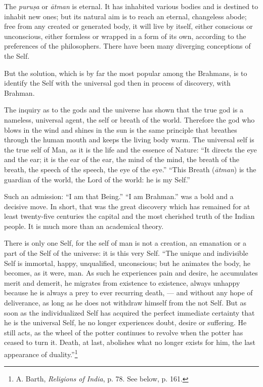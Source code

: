 \documentclass[a4paper, 11pt, oneside, english, landscape]{article}
\begin{document}
The \emph{puruṣa} or \emph{ātman} is eternal. It has inhabited various bodies and is destined to inhabit new ones; but its natural aim is to reach an eternal, changeless abode; free from any created or generated body, it will live by itself, either conscious or unconscious, either formless or wrapped in a form of its own, according to the preferences of the philosophers. There have been many diverging conceptions of the Self.

But the solution, which is by far the most popular among the Brahmans, is to identify the Self with the universal god then in process of discovery, with Brahman.

The inquiry as to the gods and the universe has shown that the true god is a nameless, universal agent, the self or breath of the world. Therefore the god who blows in the wind and shines in the sun is the same principle that breathes through the human mouth and keeps the living body warm. The universal self is the true self of Man, as it is the life and the essence of Nature: ``It directs the eye and the ear; it is the ear of the ear, the mind of the mind, the breath of the breath, the speech of the speech, the eye of the eye.'' ``This Breath (\emph{ātman}) is the guardian of the world, the Lord of the world: he is my Self.''

Such an admission: ``I am that Being.'' ``I am Brahman.'' was a bold and a decisive move. In short, that was the great discovery which has remained for at least twenty-five centuries the capital and the most cherished truth of the Indian people. It is much more than an academical theory.

There is only one Self, for the self of man is not a creation, an emanation or a part of the Self of the universe: it is this very Self. ``The unique and indivisible Self is immortal, happy, unqualified, unconscious; but he animates the body, he becomes, as it were, man. As such he experiences pain and desire, he accumulates merit and demerit, he migrates from existence to existence, always unhappy because he is always a prey to ever recurring death, --- and without any hope of deliverance, as long as he does not withdraw himself from the not Self. But as soon as the individualized Self has acquired the perfect immediate certainty that he is the universal Self, he no longer experiences doubt, desire or suffering. He still acts, as the wheel of the potter continues to revolve when the potter has ceased to turn it. Death, at last, abolishes what no longer exists for him, the last appearance of duality.''\footnote{A. Barth, \emph{Religions of India}, p. 78. See below, p. 161.}
\end{document}
